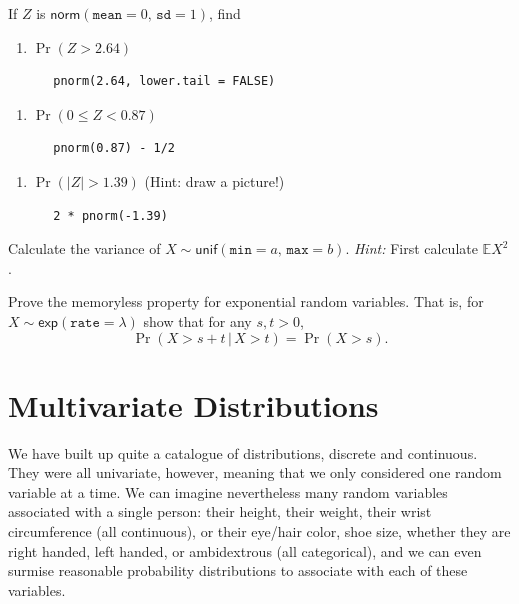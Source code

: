 \documentclass[captions=tableheading]{scrbook}
\begin{document}
\begin{xca}
If \(Z\) is \(\mathsf{norm}(\mathtt{mean}=0,\,\mathtt{sd}=1)\), find 
\begin{enumerate}
\item \(\Pr(Z>2.64)\)

\begin{verbatim}
   pnorm(2.64, lower.tail = FALSE)
\end{verbatim}
\end{enumerate}

\begin{enumerate}
\item \(\Pr(0\leq Z<0.87)\)

\begin{verbatim}
   pnorm(0.87) - 1/2
\end{verbatim}
\end{enumerate}

\begin{enumerate}
\item \(\Pr(|Z|>1.39)\) (Hint: draw a picture!)

\begin{verbatim}
   2 * pnorm(-1.39)
\end{verbatim}
\end{enumerate}

\end{xca}

\begin{xca}
Calculate the variance of \(X\sim\mathsf{unif}(\mathtt{min}=a,\,\mathtt{max}=b)\). \emph{Hint:} First calculate \(\mathbb{E} X^{2}\).
\end{xca}

\begin{xca}
Prove the memoryless property for exponential random variables. That is, for \(X\sim\mathsf{exp}(\mathtt{rate}=\lambda)\) show that for any \(s,t>0\),
\[
\Pr(X>s+t\,|\, X>t)=\Pr(X>s).
\]
\end{xca}
\chapter{Multivariate Distributions}
\label{sec-7}
\label{cha-Multivariable-Distributions}



\noindent 
We have built up quite a catalogue of distributions, discrete and continuous. They were all univariate, however, meaning that we only considered one random variable at a time. We can imagine nevertheless many random variables associated with a single person: their height, their weight, their wrist circumference (all continuous), or their eye/hair color, shoe size, whether they are right handed, left handed, or ambidextrous (all categorical), and we can even surmise reasonable probability distributions to associate with each of these variables.
\end{document}
